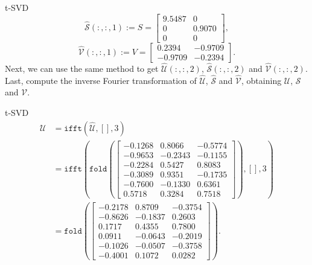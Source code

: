 \documentclass{beamer}
\begin{document}
\begin{frame}{t-SVD}
$$
\hat{\mathcal{S}}(:,:,1):=S=\left[\begin{array}{cc}
    9.5487  &       0\\
         0  &  0.9070\\
         0  &       0
\end{array}\right],
$$
$$
\hat{\mathcal{V}}(:,:,1):=V=\left[\begin{array}{cc}
    0.2394  & -0.9709\\
   -0.9709  & -0.2394
\end{array}\right].
$$
Next, we can use the same method to get $\hat{\mathcal{U}}(:,:,2)$, $\hat{\mathcal{S}}(:,:,2)$ and $\hat{\mathcal{V}}(:,:,2)$. Last, compute the inverse Fourier transformation of $\hat{\mathcal{U}}$, $\hat{\mathcal{S}}$ and $\hat{\mathcal{V}}$, obtaining $\mathcal{U}$, $\mathcal{S}$ and $\mathcal{V}$.
\end{frame}

\begin{frame}{t-SVD}
$$
\begin{aligned}
\mathcal{U}&=\texttt{ifft}(\hat{\mathcal{U}},[],3)\\
&=\texttt{ifft}(\texttt{fold}\left(
\left[\begin{array}{ccc}
   -0.1268  &  0.8066 & -0.5774\\
   -0.9653  & -0.2343  & -0.1155\\
   -0.2284  &  0.5427  &  0.8083\\
\hline
   -0.3089  &  0.9351  & -0.1735\\
   -0.7600  & -0.1330  &  0.6361\\
    0.5718  &  0.3284  &  0.7518
\end{array}\right]\right),[],3)\\
&=\texttt{fold}\left(
\left[\begin{array}{ccc}
   -0.2178  &  0.8709 &  -0.3754\\
   -0.8626  & -0.1837  &  0.2603\\
    0.1717  &  0.4355  &  0.7800\\
\hline
    0.0911  & -0.0643  & -0.2019\\
   -0.1026  & -0.0507  & -0.3758\\
   -0.4001  &  0.1072  &  0.0282
\end{array}\right]\right).
\end{aligned}
$$

\end{frame}
\end{document}
